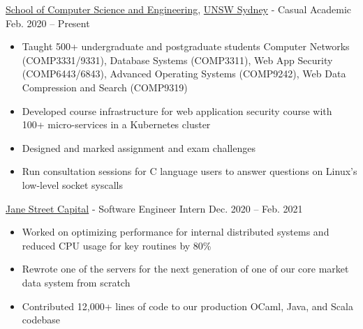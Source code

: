 \documentclass[hidelinks__VERSION__]{adamyi-cv}
\begin{document}
\begin{entrylist}


\entry
{\href{https://www.cse.unsw.edu.au/}{School of Computer Science and Engineering}, \href{https://unsw.edu.au/}{UNSW Sydney} - Casual Academic}
{Feb. 2020 -- Present}
{
\begin{minipage}[t]{1\linewidth}
\begin{itemize}[leftmargin=*,align=left,noitemsep]
\item Taught 500+ undergraduate and postgraduate students Computer Networks (COMP3331/9331), Database Systems (COMP3311), Web App Security (COMP6443/6843), Advanced Operating Systems (COMP9242), Web Data Compression and Search (COMP9319)
\item Developed course infrastructure for web application security course with 100+ micro-services in a Kubernetes cluster
\item Designed and marked assignment and exam challenges
\item Run consultation sessions for C language users to answer questions on Linux's low-level socket syscalls
\end{itemize}
\end{minipage}
}


\entry
{\href{https://www.janestreet.com/}{Jane Street Capital} - Software Engineer Intern}
{Dec. 2020 -- Feb. 2021}
{
\begin{minipage}[t]{1\linewidth}
\begin{itemize}[leftmargin=*,align=left,noitemsep]
\item Worked on optimizing performance for internal distributed systems and reduced CPU usage for key routines by 80\%
\item Rewrote one of the servers for the next generation of one of our core market data system from scratch
\item Contributed 12,000+ lines of code to our production OCaml, Java, and Scala codebase
\end{itemize}
\end{minipage}
}

\end{entrylist}

\end{document}
